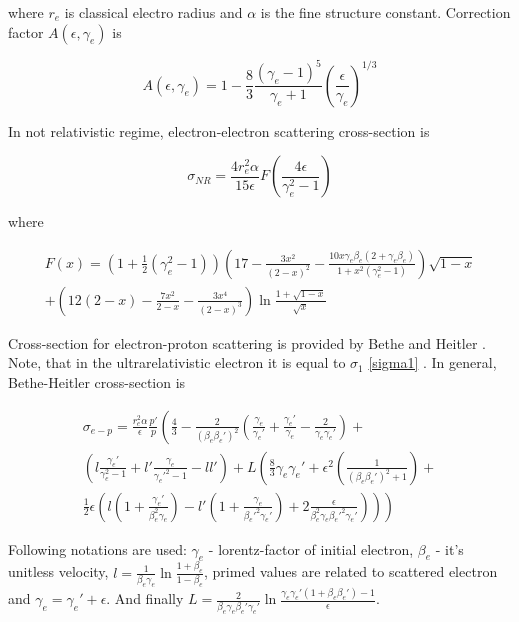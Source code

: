 where $r_e$ is classical electro radius and $\alpha$ is the fine structure constant. Correction factor $A(\epsilon, \gamma_e)$ is

\begin{equation}
	A\left(\epsilon, \gamma_e\right)=1-\frac{8}{3}\frac{\left(\gamma_e-1\right)^5}{\gamma_e + 1}\left(\frac{\epsilon}{\gamma_e}\right)^{1/3}
\end{equation}

In not relativistic regime, electron-electron scattering cross-section is 

\begin{equation}
	\sigma_{NR}=\frac{4r_e^2\alpha}{15\epsilon}F\left(\frac{4\epsilon}{\gamma_e^2-1}\right)
\end{equation}

where

\begin{equation}
	\begin{split}
	F(x) = \left(1+\frac{1}{2}\left(\gamma_e^2-1\right)\right)\left(17-\frac{3x^2}{\left(2-x\right)^2}-\frac{10x\gamma_e\beta_e\left(2+\gamma_e\beta_e\right)}{1+x^2\left(\gamma_e^2-1\right)}\right)\sqrt{1-x} \\ +\left(12\left(2-x\right)-\frac{7x^2}{2-x}-\frac{3x^4}{\left(2-x\right)^3}\right)\ln\frac{1+\sqrt{1-x}}{\sqrt{x}}
	\end{split}
\end{equation}

Cross-section for electron-proton scattering is provided by Bethe and Heitler \cite{BetheHeitler}. Note, that in the ultrarelativistic electron it is equal to $\sigma_1$ \ref{sigma1} \cite{JauchRohrlich}. In general, Bethe-Heitler cross-section is

\begin{equation}
	\begin{split}
	\sigma_{e-p} = \frac{r_e^2\alpha}{\epsilon}\frac{p'}{p}\left(\frac{4}{3}-\frac{2}{\left(\beta_e\beta_e'\right)^2}\left(\frac{\gamma_e}{\gamma_e'}+\frac{\gamma_e'}{\gamma_e}-\frac{2}{\gamma_e\gamma_e'}\right) + \right. \\ \left. \left(l\frac{\gamma_e'}{\gamma_e^2-1}+l'\frac{\gamma_e}{\gamma_e'^2-1}-l l'\right) + L\left(\frac{8}{3}\gamma_e\gamma_e'+\epsilon^2\left(\frac{1}{\left(\beta_e\beta_e'\right)^2+1}\right)+ \right. \right. \\ \left. \left. \frac{1}{2}\epsilon\left(l\left(1+\frac{\gamma_e'}{\beta_e^2\gamma_e}\right)-l'\left(1+\frac{\gamma_e}{\beta_e'^2\gamma_e'}\right)+2\frac{\epsilon}{\beta_e^2\gamma_e\beta_e'^2\gamma_e'}\right)\right)\right)
	\end{split}
\end{equation}

Following notations are used: $\gamma_e$ - lorentz-factor of initial electron, $\beta_e$ - it's unitless velocity, $l = \frac{1}{\beta_e\gamma_e}\ln\frac{1+\beta_e}{1-\beta_e}$, primed values are related to scattered electron and $\gamma_e = \gamma_e' + \epsilon$. And finally $L = \frac{2}{\beta_e\gamma_e\beta_e'\gamma_e'}\ln\frac{\gamma_e\gamma_e'\left(1+\beta_e\beta_e'\right)-1}{\epsilon}$.